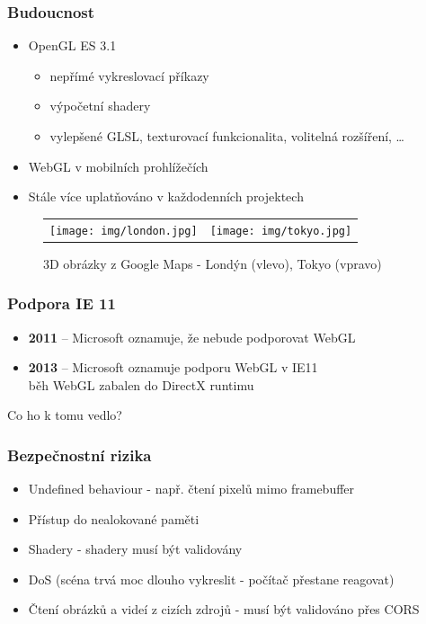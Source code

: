 \documentclass{beamer}
\begin{document}
		\begin{frame}[t,fragile]
		\frametitle{Budoucnost}					
		\begin{itemize}
			\item OpenGL ES 3.1
			\begin{itemize}
				\item nepřímé vykreslovací příkazy
				\item výpočetní shadery
				\item vylepšené GLSL, texturovací funkcionalita, volitelná rozšíření, \dots
			\end{itemize}
			\item WebGL v mobilních prohlížečích
			\item Stále více uplatňováno v každodenních projektech
		\end{itemize}	
		
		\vspace{-3mm}				
		
		\begin{figure}
		\centering\begin{tabular}{ll}
			\texttt{[image: img/london.jpg]} &		
			\texttt{[image: img/tokyo.jpg]}
		\end{tabular}		
		\caption{3D obrázky z Google Maps - Londýn (vlevo), Tokyo (vpravo)}
		\end{figure}
									
	\end{frame}	
	
	
	\begin{frame}[t,fragile]
		\frametitle{Podpora IE 11}					
		\begin{itemize}
	    	\item \textbf{2011} – Microsoft oznamuje, že nebude podporovat WebGL
			\item \textbf{2013} – Microsoft oznamuje podporu WebGL v IE11 \\
			\footnotesize{běh WebGL zabalen do DirectX runtimu}		
		\end{itemize}	
		
		\vspace{15mm}
		\centering
		\Huge{Co ho k tomu vedlo?}
		
		
		
	\end{frame}
	

	\begin{frame}[t,fragile]
		\frametitle{Bezpečnostní rizika}					
		\begin{itemize}
			\item Undefined behaviour - např. čtení pixelů mimo framebuffer
			\item Přístup do nealokované paměti
			\item Shadery - shadery musí být validovány
			\item DoS (scéna trvá moc dlouho vykreslit - počítač přestane reagovat)
			\item Čtení obrázků a videí z cizích zdrojů - musí být validováno přes CORS	
		\end{itemize}	

	\end{frame}
	
\end{document}

